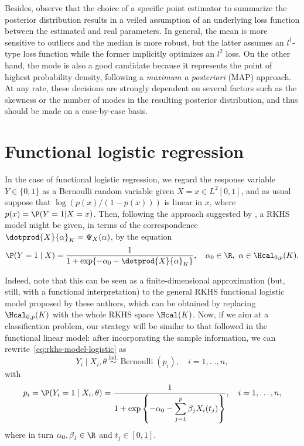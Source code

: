 Besides, observe that the choice of a specific point estimator to summarize the posterior distribution results in a veiled assumption of an underlying loss function between the estimated and real parameters. In general, the mean is more sensitive to outliers and the median is more robust, but the latter assumes an \(l^1\)-type loss function while the former implicitly optimizes an \(l^2\) loss. On the other hand, the mode is also a good candidate because it represents the point of highest probability density, following a \textit{maximum a posteriori} (MAP) approach. At any rate, these decisions are strongly dependent on several factors such as the skewness or the number of modes in the resulting posterior distribution, and thus should be made on a case-by-case basis.

\newpage

\section{Functional logistic regression}\label{sec:rkhs-logistic-model}

In the case of functional logistic regression, we regard the response variable \(Y\in\{0, 1\}\) as a Bernoulli random variable given \(X=x \in L^2[0, 1]\), and as usual suppose that \(\log\left(p(x)/(1-p(x))\right)\) is linear in \(x\), where \(p(x)=\P(Y=1| X=x)\). Then, following the approach  suggested by \citet{berrendero2023functional}, a RKHS model might be given, in terms of the correspondence \(\dotprod{X}{\alpha}_K = \Psi_X(\alpha)\), by the equation
\begin{equation}\label{eq:rkhs-model-logistic}
  \P(Y=1 \mid X) = \frac{1}{1 + \exp\{-\alpha_0 - \dotprod{X}{\alpha}_K\}}, \quad \alpha_0 \in \R, \ \alpha \in \Hcal_{0,p}(K).
\end{equation}

Indeed, note that this can be seen as a finite-dimensional approximation (but, still, with a functional interpretation) to the general RKHS functional logistic model proposed by these authors, which can be obtained by replacing \(\Hcal_{0,p}(K)\) with the whole RKHS space \(\Hcal(K)\). Now, if we aim at a classification problem, our strategy will be similar to that followed in the functional linear model: after incorporating the sample information, we can rewrite~\eqref{eq:rkhs-model-logistic} as
\begin{equation}\label{eq:rkhs-model-logistic-2}
Y_i \mid X_i,\theta \ \stackrel{\text{ind.}}{\sim} \operatorname{Bernoulli}(p_i), \quad i=1,\dots, n,
\end{equation}
with
\begin{equation}\label{eq:rkhs-model-logistic-2-parameter}
  p_i = \P(Y_i=1 \mid X_i,\theta) = \frac{1}{\displaystyle 1 + \exp\left\{-\alpha_0 - \sum_{j=1}^p \beta_j X_i(t_j)\right\}}, \quad i=1,\dots, n,
\end{equation}
where in turn \(\alpha_0, \beta_j\in\R\) and \(t_j\in[0, 1]\).

